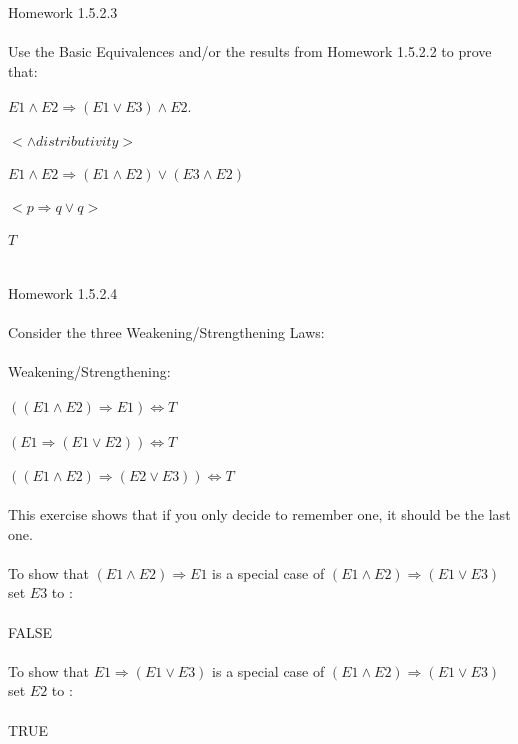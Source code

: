 \documentclass[11pt]{article}
\begin{document}
\\
\\
\\
\\
\\
\\
\\
Homework 1.5.2.3
\\
\\
Use the Basic Equivalences and/or the results from Homework 1.5.2.2 to prove that:
\\
\\
$E1 \land E2 \Rightarrow (E1 \vee E3) \land E2.$
\\
\\
$< \land distributivity >$
\\
\\
$E1 \land E2 \Rightarrow (E1 \land E2) \vee (E3 \land E2)$
\\
\\
$< p \Rightarrow q \vee q>$
\\
\\
$T$
\\
\\
\\
Homework 1.5.2.4
\\
\\
Consider the three Weakening/Strengthening Laws: 
\\
\\
Weakening/Strengthening:
\\
\\
$((E1 \land E2) \Rightarrow E1) \Leftrightarrow T$
\\
\\
$(E1 \Rightarrow (E1 \vee E2)) \Leftrightarrow T$
\\
\\
$((E1 \land E2) \Rightarrow (E2 \vee E3)) \Leftrightarrow T$
\\
\\
This exercise shows that if you only decide to remember one, it should be the last one.
\\
\\
To show that $(E1 \land E2) \Rightarrow E1$ is a special case of $(E1 \land E2) \Rightarrow (E1 \vee E3)$ set $E3$ to :
\\
\\
FALSE
\\
\\
To show that $E1 \Rightarrow (E1 \vee E3)$ is a special case of $(E1 \land E2) \Rightarrow (E1 \vee E3)$ set $E2$ to : 
\\
\\
TRUE
\\
\\
\end{document}
